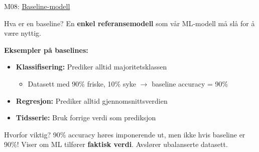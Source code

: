 \documentclass[aspectratio=169, 10pt]{beamer}
\begin{document}
\begin{frame}{M08: \href{https://en.wikipedia.org/wiki/Baseline_(machine_learning)}{Baseline-modell}}

    \begin{block}{\footnotesize Hva er en baseline?}
        \footnotesize En \textbf{enkel referansemodell} som vår ML-modell må slå for å være nyttig.
    \end{block}

    \vspace{2mm}
    \textbf{Eksempler på baselines:}

    \begin{itemize}
        \item \textbf{Klassifisering:} Prediker alltid majoritetsklassen
        \begin{itemize}
            \item Datasett med 90\% friske, 10\% syke $\rightarrow$ baseline accuracy = 90\%
        \end{itemize}
        \item \textbf{Regresjon:} Prediker alltid gjennomsnittsverdien
        \item \textbf{Tidsserie:} Bruk forrige verdi som prediksjon
    \end{itemize}

    \vspace{2mm}
    \begin{alertblock}{\footnotesize Hvorfor viktig?}
        \footnotesize
        90\% accuracy høres imponerende ut, men ikke hvis baseline er 90\%! Viser om ML tilfører \textbf{faktisk verdi}. Avslører ubalanserte datasett.
    \end{alertblock}

\end{frame}
\end{document}
